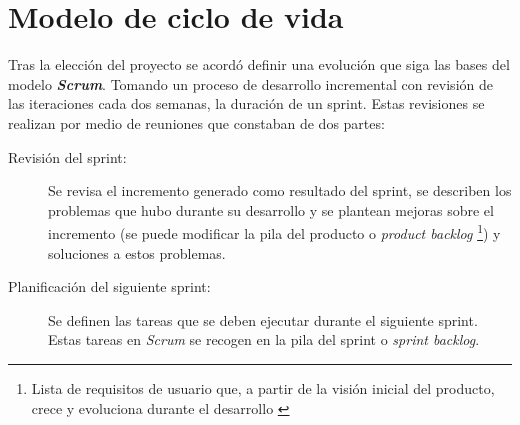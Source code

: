 \section{Modelo de ciclo de vida}

Tras la elección del proyecto se acordó definir una evolución que siga las bases del modelo \textit{\textbf{Scrum}}. Tomando un proceso de desarrollo incremental con revisión de las iteraciones cada dos semanas, la duración de un sprint. Estas revisiones se realizan por medio de reuniones que constaban de dos partes:
\begin{description}
	\item [Revisión del sprint:] Se revisa el incremento generado como resultado del sprint, se describen los problemas que hubo durante su desarrollo y se plantean mejoras sobre el incremento (se puede modificar la pila del producto o \textit{product backlog} \footnote{Lista de requisitos de usuario que, a partir de la visión inicial del producto, crece y evoluciona durante el desarrollo \citep{noauthor_scrum_2019}}) y soluciones a estos problemas.
	\item [Planificación del siguiente sprint:] Se definen las tareas que se deben ejecutar durante el siguiente sprint. Estas tareas en \textit{Scrum} se recogen en la pila del sprint o \textit{sprint backlog}.
\end{description}

